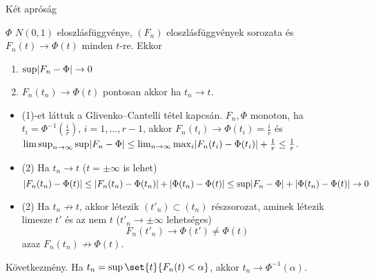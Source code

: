 \documentclass[aspectratio=169,notheorems,9pt,\option]{beamer}
\begin{document}
  \begin{frame}{Két apróság}
    \begin{proposition}
      $\Phi$ $N (0,1)$ eloszlásfüggvénye, $(F_n)$ eloszlásfüggvények
      sorozata és  $F_n (t)\to \Phi (t)$ minden $t$-re.  Ekkor
      \begin{enumerate}[<*>]
      \item $\sup\abs*{F_n-\Phi}\to0$ 
      \item $F_n (t_n)\to \Phi (t)$ pontosan akkor ha $t_n\to t$.
      \end{enumerate}
    \end{proposition}
    \begin{itemize}
    \item (1)-et láttuk a  Glivenko--Cantelli
      tétel kapcsán. $F_n,\Phi$ monoton, ha $t_i=\Phi^{-1}(\frac ir)$, $i=1,\dots,r-1$, akkor
      $F_n(t_i)\to\Phi(t_i)=\frac ir$ és %
      $\limsup_{n\to\infty}\sup \lvert F_n-\Phi\rvert
      \leq\lim_{n\to\infty}\max_i \lvert F_n(t_i)-\Phi(t_i)\rvert+\frac1r
      \leq \frac{1}{r}$.
    \item (2) Ha $t_n\to t$ ($t=\pm\infty$ is lehet)
      \begin{displaymath}
        \abs*{F_n (t_n)-\Phi (t)}\leq \abs*{F_n (t_n)-\Phi (t_n)}+\abs*{\Phi(t_n)-\Phi (t)}
        \leq \sup\abs*{F_n-\Phi}+\abs*{\Phi(t_n)-\Phi (t)}\to0
      \end{displaymath}
      
    \item (2) Ha $t_n\not\to t$, akkor létezik $(t'_n)\subset (t_n)$
      részsorozat, aminek létezik limesze $t'$ és az nem $t$ ($t'_n\to\pm\infty$ lehetséges)
      \begin{displaymath}
        F_n (t'_n)\to\Phi (t')\neq\Phi (t)
      \end{displaymath}
      azaz $F_n (t_n)\not\to\Phi (t)$.
    \end{itemize}
    \continue
    Következmény. Ha $t_n=\sup\set{t}{F_n (t)<\alpha}$, akkor $t_n\to\Phi^{-1} (\alpha)$.
  \end{frame}
\end{document}
